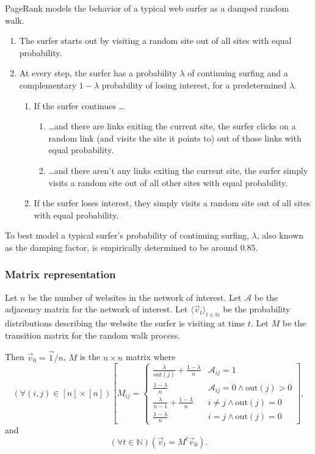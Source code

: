 \documentclass[12pt, titlepage, twoside]{amsart}
\newcommand{\N}{\ensuremath{\mathbb N}}
\begin{document}
PageRank models the behavior of a typical web surfer as a damped random walk.~\cite{pagerank}

\begin{enumerate}
  \item The surfer starts out by visiting a random site out of all sites with equal probability.
  \item At every step, the surfer has a probability $\lambda$ of continuing surfing and a complementary
    $1 - \lambda$ probability of losing interest, for a predetermined $\lambda$.
  
    \begin{enumerate}
      \item If the surfer continues \ldots

        \begin{enumerate}
          \item \ldots and there are links exiting the current site, the surfer
            clicks on a random link (and visits the site it points to) out of those links with equal probability.
          \item \ldots and there aren't any links exiting the current site, the surfer simply
            visits a random site out of all other sites with equal probability.
        \end{enumerate}

      \item If the surfer loses interest, they simply visits a random site out of all sites with equal probability.
    \end{enumerate}

\end{enumerate}

To best model a typical surfer's probability of continuing surfing, $\lambda$, also known as the damping factor,
is empirically determined to be around $0.85$.

\subsubsection{Matrix representation}

Let $n$ be the number of websites in the network of interest.
Let $\mathcal{A}$ be the adjacency matrix for the network of interest.
Let $\langle\vec{v}_{t}\rangle_{t\in\N}$ be the probability distributions describing the
website the surfer is visiting at time $t$.
Let $M$ be the transition matrix for the random walk process.

Then $\vec{v}_0 = \vec{1} / n$,
$M$ is the $n\times n$ matrix where
\[
  (\forall (i, j)\in[n]\times[n])
  \left[
  M_{ij} =
  \begin{cases}
    \frac{\lambda}{\mathrm{out}(j)} + \frac{1 - \lambda}{n}
    & \mathcal{A}_{ij} = 1 \\
    \frac{1 - \lambda}{n}
    & \mathcal{A}_{ij} = 0\wedge\mathrm{out}(j) > 0 \\
    \frac{\lambda}{n - 1} + \frac{1 - \lambda}{n}
    & i \neq j\wedge\mathrm{out}(j) = 0 \\
    \frac{1 - \lambda}{n}
    & i = j\wedge\mathrm{out}(j) = 0
  \end{cases}
  \right],
\]
and
\[
  (\forall t\in\N)\left(\vec{v}_t = M^t\vec{v}_0\right).
\]
\end{document}
